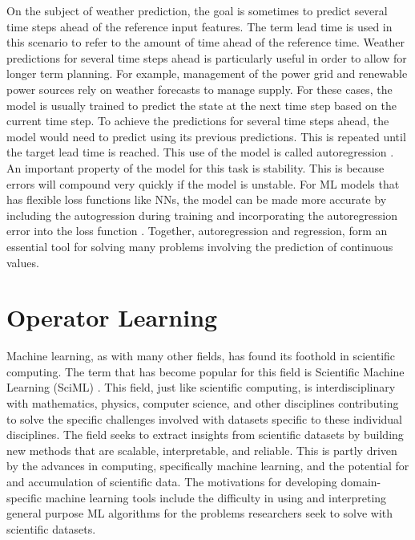On the subject of weather prediction, the goal is sometimes to predict several time steps ahead of the reference input features. The term lead time is used in this scenario to refer to the amount of time ahead of the reference time. Weather predictions for several time steps ahead is particularly useful in order to allow for longer term planning. For example, management of the power grid and renewable power sources rely on weather forecasts to manage supply. For these cases, the model is usually trained to predict the state at the next time step based on the current time step. To achieve the predictions for several time steps ahead, the model would need to predict using its previous predictions. This is repeated until the target lead time is reached. This use of the model is called autoregression \autocite{maccarroneGDPForecastingMachine2021}. An important property of the model for this task is stability. This is because errors will compound very quickly if the model is unstable. For ML models that has flexible loss functions like NNs, the model can be made more accurate by including the autogression during training and incorporating the autoregression error into the loss function \autocite{pmlr-v32-gregor14}. Together, autoregression and regression, form an essential tool for solving many problems involving the prediction of continuous values.

\section{Operator Learning}
\noindent Machine learning, as with many other fields, has found its foothold in scientific computing. The term that has become popular for this field is Scientific Machine Learning (SciML) \autocite{bakerWorkshopReportBasic2019}. This field, just like scientific computing, is interdisciplinary with mathematics, physics, computer science, and other disciplines contributing to solve the specific challenges involved with datasets specific to these individual disciplines. The field seeks to extract insights from scientific datasets by building new methods that are scalable, interpretable, and reliable. This is partly driven by the advances in computing, specifically machine learning, and the potential for and accumulation of scientific data. The motivations for developing domain-specific machine learning tools include the difficulty in using and interpreting general purpose ML algorithms for the problems researchers seek to solve with scientific datasets.

